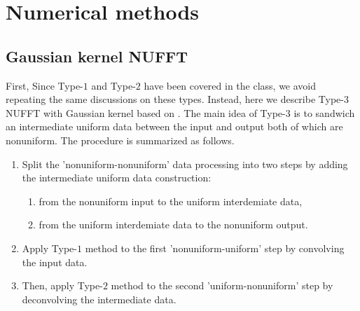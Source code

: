 \section{Numerical methods}


\subsection{Gaussian kernel NUFFT}

First,
Since Type-$1$ and Type-$2$ have been covered in the class, we avoid repeating the same discussions on these types.
Instead, here we describe Type-$3$ NUFFT with Gaussian kernel based on \cite{JCP-2003-Greengard}.
The main idea of Type-$3$ is to sandwich an intermediate uniform data between the input and output both of which are nonuniform.
The procedure is summarized as follows.
\begin{enumerate}
  \item Split the 'nonuniform-nonuniform' data processing into two steps
  by adding the intermediate uniform data construction:
  \begin{enumerate}
    \item from the nonuniform input to the uniform interdemiate data,
    \item from the uniform interdemiate data to the nonuniform output.
  \end{enumerate}
  \item Apply Type-$1$ method to the first 'nonuniform-uniform' step by convolving the input data.
  \item Then, apply Type-$2$ method to the second 'uniform-nonuniform' step by deconvolving the intermediate data.
\end{enumerate}


